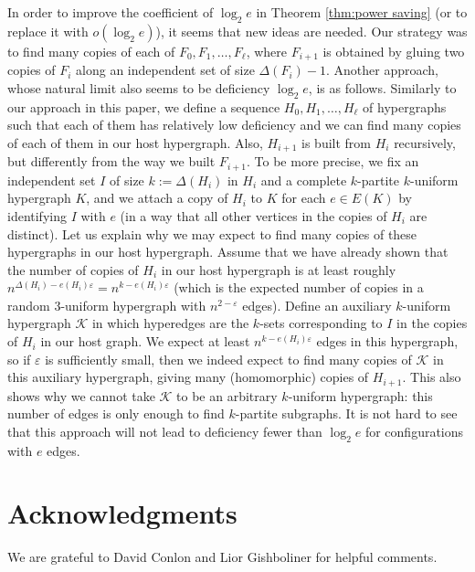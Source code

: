 \documentclass{daj}
\def\eps{\varepsilon}
\theoremstyle{plain}
\theoremstyle{remark}
\begin{document}
In order to improve the coefficient of $\log_2 e$ in Theorem \ref{thm:power saving} (or to replace it with $o(\log_2 e)$), it seems that new ideas are needed. Our strategy was to find many copies of each of $F_0,F_1,\dots,F_{\ell}$, where $F_{i+1}$ is obtained by gluing two copies of $F_i$ along an independent set of size $\Delta(F_i)-1$. Another approach, whose natural limit also seems to be deficiency $\log_2 e$, is as follows. Similarly to our approach in this paper, we define a sequence $H_0,H_1,\dots,H_{\ell}$ of hypergraphs such that each of them has relatively low deficiency and we can find many copies of each of them in our host hypergraph. Also, $H_{i+1}$ is built from $H_i$ recursively, but differently from the way we built $F_{i+1}$. To be more precise, we fix an independent set $I$ of size $k:=\Delta(H_i)$ in $H_i$ and a complete $k$-partite $k$-uniform hypergraph $K$, and we attach a copy of $H_i$ to $K$ for each $e\in E(K)$ by identifying $I$ with $e$ (in a way that all other vertices in the copies of $H_i$ are distinct). Let us explain why we may expect to find many copies of these hypergraphs in our host hypergraph. Assume that we have already shown that the number of copies of $H_i$ in our host hypergraph is at least roughly $n^{\Delta(H_i)-e(H_i)\eps}=n^{k-e(H_i)\eps}$ (which is the expected number of copies in a random $3$-uniform hypergraph with $n^{2-\eps}$ edges). Define an auxiliary $k$-uniform hypergraph $\mathcal{K}$ in which hyperedges are the $k$-sets corresponding to $I$ in the copies of $H_i$ in our host graph. We expect at least $n^{k-e(H_i)\eps}$ edges in this hypergraph, so if $\eps$ is sufficiently small, then we indeed expect to find many copies of $\mathcal{K}$ in this auxiliary hypergraph, giving many (homomorphic) copies of $H_{i+1}$. This also shows why we cannot take $\mathcal{K}$ to be an arbitrary $k$-uniform hypergraph: this number of edges is only enough to find $k$-partite subgraphs. It is not hard to see that this approach will not lead to deficiency fewer than $\log_2 e$ for configurations with $e$ edges.






\section*{Acknowledgments} %
We are grateful to David Conlon and Lior Gishboliner for helpful comments.
\end{document}
